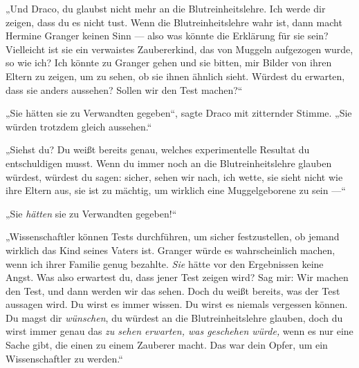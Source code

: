 „Und Draco, du glaubst nicht mehr an die Blutreinheitslehre. Ich werde dir zeigen, dass du es nicht tust. Wenn die Blutreinheitslehre wahr ist, dann macht Hermine Granger keinen Sinn — also was könnte die Erklärung für sie sein? Vielleicht ist sie ein verwaistes Zaubererkind, das von Muggeln aufgezogen wurde, so wie ich? Ich könnte zu Granger gehen und sie bitten, mir Bilder von ihren Eltern zu zeigen, um zu sehen, ob sie ihnen ähnlich sieht. Würdest du erwarten, dass sie anders aussehen? Sollen wir den Test machen?“

„Sie hätten sie zu Verwandten gegeben“, sagte Draco mit zitternder Stimme.
„Sie würden trotzdem gleich aussehen.“

„Siehst du? Du weißt bereits genau, welches experimentelle Resultat du entschuldigen musst. Wenn du immer noch an die Blutreinheitslehre glauben würdest, würdest du sagen: sicher, sehen wir nach, ich wette, sie sieht nicht wie ihre Eltern aus, sie ist zu mächtig, um wirklich eine Muggelgeborene zu sein —“

„Sie \emph{hätten} sie zu Verwandten gegeben!“

„Wissenschaftler können Tests durchführen, um sicher festzustellen, ob jemand wirklich das Kind seines Vaters ist. Granger würde es wahrscheinlich machen, wenn ich ihrer Familie genug bezahlte. \emph{Sie} hätte vor den Ergebnissen keine Angst. Was also erwartest du, dass jener Test zeigen wird? Sag mir: Wir machen den Test, und dann werden wir das sehen. Doch du weißt bereits, was der Test aussagen wird. Du wirst es immer wissen. Du wirst es niemals vergessen können. Du magst dir \emph{wünschen}, du würdest an die Blutreinheitslehre glauben, doch du wirst immer genau das \emph{zu sehen erwarten, was geschehen würde,} wenn es nur eine Sache gibt, die einen zu einem Zauberer macht. Das war dein Opfer, um ein Wissenschaftler zu werden.“

